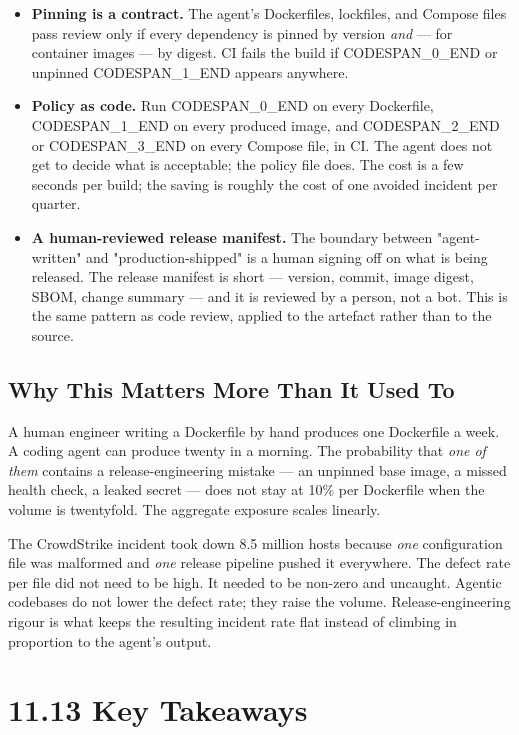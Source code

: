 \documentclass[11pt,a4paper]{book}
\begin{document}
\begin{itemize}
  \item \textbf{Pinning is a contract.} The agent's Dockerfiles, lockfiles, and Compose files pass review only if every dependency is pinned by version \textit{and} --- for container images --- by digest. CI fails the build if CODESPAN\_0\_END or unpinned CODESPAN\_1\_END appears anywhere.
  \item \textbf{Policy as code.} Run CODESPAN\_0\_END on every Dockerfile, CODESPAN\_1\_END on every produced image, and CODESPAN\_2\_END or CODESPAN\_3\_END on every Compose file, in CI. The agent does not get to decide what is acceptable; the policy file does. The cost is a few seconds per build; the saving is roughly the cost of one avoided incident per quarter.
  \item \textbf{A human-reviewed release manifest.} The boundary between "agent-written" and "production-shipped" is a human signing off on what is being released. The release manifest is short --- version, commit, image digest, SBOM, change summary --- and it is reviewed by a person, not a bot. This is the same pattern as code review, applied to the artefact rather than to the source.
\end{itemize}

\subsection{Why This Matters More Than It Used To}

A human engineer writing a Dockerfile by hand produces one Dockerfile a week. A coding agent can produce twenty in a morning. The probability that \textit{one of them} contains a release-engineering mistake --- an unpinned base image, a missed health check, a leaked secret --- does not stay at 10\% per Dockerfile when the volume is twentyfold. The aggregate exposure scales linearly.

The CrowdStrike incident took down 8.5 million hosts because \textit{one} configuration file was malformed and \textit{one} release pipeline pushed it everywhere. The defect rate per file did not need to be high. It needed to be non-zero and uncaught. Agentic codebases do not lower the defect rate; they raise the volume. Release-engineering rigour is what keeps the resulting incident rate flat instead of climbing in proportion to the agent's output.

\medskip

\section{11.13 Key Takeaways}
\end{document}
